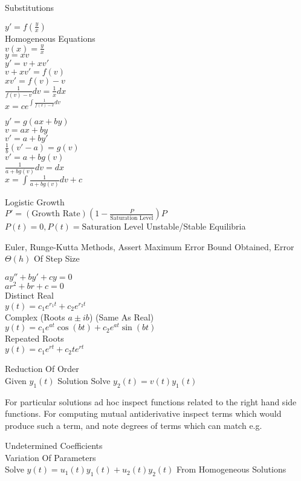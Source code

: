 Substitutions

$y'=f\left(\frac{y}{x} \right)$ \\
Homogeneous Equations \\
$v(x)=\frac{y}{x}$ \\
$y=xv$ \\
$y'=v+xv'$ \\
$v+xv'=f(v)$ \\
$xv'=f(v)-v$ \\
$\frac{1}{f(v)-v} dv=\frac{1}{x}dx$ \\
$x=ce^{\int \frac{1}{f(v)-v} dv}$

$y'=g(ax+by)$ \\
$v=ax+by$ \\
$v'=a+by'$ \\
$\frac{1}{b}(v'-a)=g(v)$ \\
$v'=a+bg(v)$ \\
$\frac{1}{a+bg(v)}dv=dx$ \\
$x=\int \frac{1}{a+bg(v)} dv +c$

Logistic Growth \\
$P'=(\text{Growth Rate})\left(1-\frac{P}{\text{Saturation Level}} \right)P$ \\
$P(t)=0,P(t)=\text{Saturation Level}$ Unstable/Stable Equilibria

Euler, Runge-Kutta Methods, Assert Maximum Error Bound Obtained, Error $\Theta(h)$ Of Step Size

$ay''+by'+cy=0$ \\
$ar^2+br+c=0$ \\
Distinct Real \\
$y(t)=c_1 e^{r_1 t}+c_2 e^{r_2 t}$ \\
Complex (Roots $a \pm ib$) (Same As Real) \\
$y(t)=c_1 e^{at} \cos(bt) + c_2 e^{at} \sin(bt)$ \\
Repeated Roots \\
$y(t)=c_1 e^{rt} + c_2 t e^{rt}$

Reduction Of Order \\
Given $y_1(t)$ Solution Solve $y_2(t)=v(t)y_1(t)$

For particular solutions ad hoc inspect functions related to the right hand side functions. For computing mutual antiderivative inspect terms which would produce such a term, and note degrees of terms which can match e.g.

Undetermined Coefficients \\
Variation Of Parameters \\
Solve $y(t)=u_1(t)y_1(t)+u_2(t)y_2(t)$ From Homogeneous Solutions


